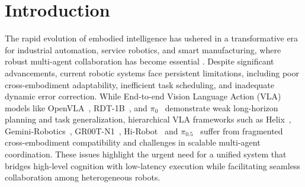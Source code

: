 \section{Introduction}
\label{sec:intro}

The rapid evolution of embodied intelligence has ushered in a transformative era for industrial automation, service robotics, and smart manufacturing, where robust multi-agent collaboration has become essential \cite{amazon_robotics_2025, mandi2024roco, an2023multi, liu2024coherent}.
Despite significant advancements, current robotic systems face persistent limitations, including poor cross-embodiment adaptability, inefficient task scheduling, and inadequate dynamic error correction.
While End-to-end Vision Language Action (VLA) models like OpenVLA~\cite{kim2024openvla}, RDT-1B~\cite{liu2024rdt}, and $\pi_{0}$~\cite{black2024pi_0} demonstrate weak long-horizon planning and task generalization, hierarchical VLA frameworks such as Helix~\cite{Helix2024}, Gemini-Robotics~\cite{team2025gemini_robo}, GR00T-N1~\cite{bjorck2025gr00t}, Hi-Robot~\cite{shi2025hi} and $\pi_{0.5}$~\cite{pi05} suffer from fragmented cross-embodiment compatibility and challenges in scalable multi-agent coordination. 
These issues highlight the urgent need for a unified system that bridges high-level cognition with low-latency execution while facilitating seamless collaboration among heterogeneous robots.


